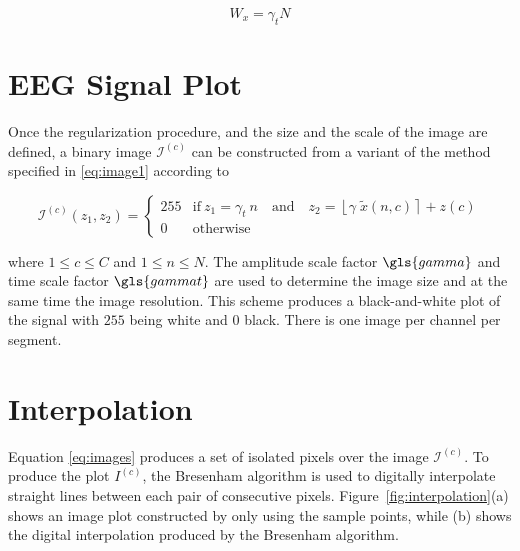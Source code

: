 \begin{equation}
W_x = \gamma_t  N
\label{eq:width}
\end{equation}

\section{EEG Signal Plot}
\label{Plot}

Once the regularization procedure, and the size and the scale of the image are defined,  a binary image $\mathcal{I}^{(c)}$ can be constructed from a variant of the method specified in \ref{eq:image1} according to

\begin{equation}
\mathcal{I}^{(c)}(z_1,z_2) = \left\{ \begin{array}{rl}
255 & \text{if} \   z_1 = \gamma_{t} \  n \quad \text{and}  \quad z_2 = \left\lfloor \gamma \; \tilde{x}(n,c) \right\rceil + z(c) \\
0   & \mbox{otherwise}
\end{array}\right.
\label{eq:images}
\end{equation}

\noindent  where  $1 \leq c \leq C$ and $1 \leq n \leq N$. The amplitude scale factor $\gls{gamma}$ and time scale factor $\gls{gammat}$ are used to determine the image size and at the same time the image resolution. This scheme produces a black-and-white plot of the signal with $255$ being white and $0$ black.  There is one image per channel per segment. 


\section{Interpolation}

Equation \ref{eq:images} produces a set of isolated pixels over the image $\mathcal{I}^{(c)}$.  To produce the plot $I^{(c)}$, the Bresenham \cite{Bresenham1965,Ramele2016} algorithm is used to digitally interpolate straight lines between each pair of consecutive pixels.  Figure~\ref{fig:interpolation}(a) shows an image plot constructed by only using the sample points, while (b) shows the digital interpolation produced by the Bresenham algorithm.

